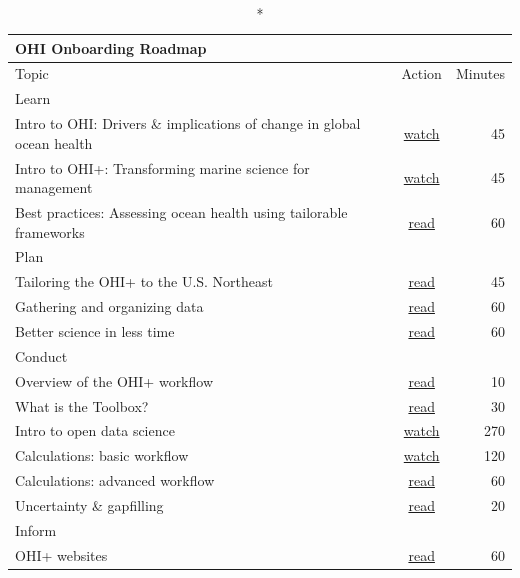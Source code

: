 \documentclass[
  letterpaper,
  DIV=11,
  numbers=noendperiod]{scrreprt}
\begin{document}
\captionsetup[table]{labelformat=empty,skip=1pt}
\begin{longtable}{lcr}
\caption*{
{\large OHI Onboarding Roadmap}
} \\ 
\toprule
Topic & Action & Minutes \\ 
\midrule
\multicolumn{1}{l}{Learn} \\ 
\midrule
Intro to OHI: Drivers \& implications of change in global ocean health & \href{https://www.openchannels.org/webinars/2019/drivers-and-implications-change-global-ocean-health-demonstrated-ocean-health-index}{watch} & 45 \\ 
Intro to OHI+: Transforming marine science for management & \href{https://www.openchannels.org/webinars/2019/using-ocean-health-index-integrated-tool-implementing-ebm-and-coastal-management}{watch} & 45 \\ 
Best practices: Assessing ocean health using tailorable frameworks & \href{https://peerj.com/articles/1503/}{read} & 60 \\ 
\midrule
\multicolumn{1}{l}{Plan} \\ 
\midrule
Tailoring the OHI+ to the U.S. Northeast & \href{https://docs.google.com/presentation/d/1u1l0a39p4wv1-5miaBpzWb-s-xo_yb0EgwwGAiqvCcM/edit?usp=sharing}{read} & 45 \\ 
Gathering and organizing data & \href{https://ohi-science.org/toolbox-training/gathering-data.html}{read} & 60 \\ 
Better science in less time & \href{https://www.nature.com/articles/s41559-017-0160}{read} & 60 \\ 
\midrule
\multicolumn{1}{l}{Conduct} \\ 
\midrule
Overview of the OHI+ workflow & \href{https://ohi-science.org/toolbox-training/intro.html}{read} & 10 \\ 
What is the Toolbox? & \href{https://docs.google.com/presentation/d/1WKzbvF-XQl3lGzEc44fp8azssod9BcY2wMaAO0ZhFmk/edit?usp=sharing}{read} & 30 \\ 
Intro to open data science & \href{https://www.youtube.com/playlist?list=PLX7J3qtjcll_4s2oaKHuWdRdBMJz7tBAU}{watch} & 270 \\ 
Calculations: basic workflow & \href{https://www.youtube.com/watch?v=gISsUvqVL_M}{watch} & 120 \\ 
Calculations: advanced workflow & \href{https://ohi-science.org/toolbox-training/calcs-advanced.html}{read} & 60 \\ 
Uncertainty \& gapfilling & \href{https://docs.google.com/presentation/d/1lp_kBSrisFjlXUZjcD7SuZlPLSvk97CCm0BzPDDmXzo/edit?usp=sharing}{read} & 20 \\ 
\midrule
\multicolumn{1}{l}{Inform} \\ 
OHI+ websites & \href{https://ohi-science.org/toolbox-training/websites.html}{read} & 60 \\ 
 \bottomrule
\end{longtable}
\end{document}

